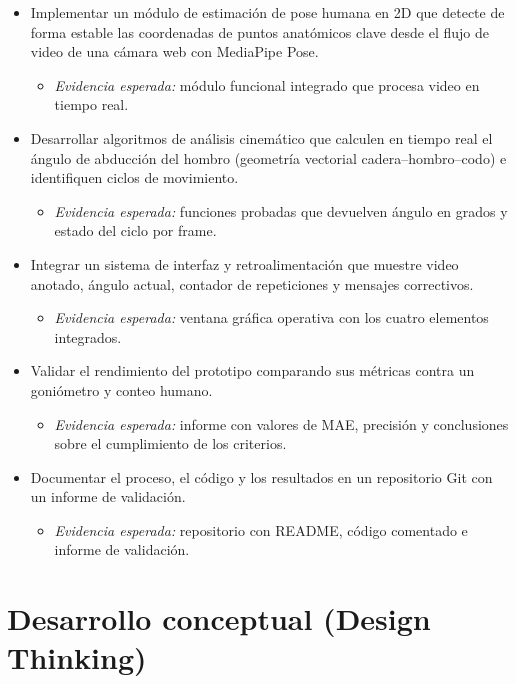 \documentclass[11pt,a4paper]{article}
\begin{document}
\begin{itemize}
  \item Implementar un módulo de estimación de pose humana en 2D que detecte de forma estable las coordenadas de puntos anatómicos clave desde el flujo de video de una cámara web con MediaPipe Pose.
  \begin{itemize}
    \item \textit{Evidencia esperada:} módulo funcional integrado que procesa video en tiempo real.
  \end{itemize}
  \item Desarrollar algoritmos de análisis cinemático que calculen en tiempo real el ángulo de abducción del hombro (geometría vectorial cadera--hombro--codo) e identifiquen ciclos de movimiento.
  \begin{itemize}
    \item \textit{Evidencia esperada:} funciones probadas que devuelven ángulo en grados y estado del ciclo por frame.
  \end{itemize}
  \item Integrar un sistema de interfaz y retroalimentación que muestre video anotado, ángulo actual, contador de repeticiones y mensajes correctivos.
  \begin{itemize}
    \item \textit{Evidencia esperada:} ventana gráfica operativa con los cuatro elementos integrados.
  \end{itemize}
  \item Validar el rendimiento del prototipo comparando sus métricas contra un goniómetro y conteo humano.
  \begin{itemize}
    \item \textit{Evidencia esperada:} informe con valores de MAE, precisión y conclusiones sobre el cumplimiento de los criterios.
  \end{itemize}
  \item Documentar el proceso, el código y los resultados en un repositorio Git con un informe de validación.
  \begin{itemize}
    \item \textit{Evidencia esperada:} repositorio con README, código comentado e informe de validación.
  \end{itemize}
\end{itemize}

\clearpage
{}
\section{Desarrollo conceptual (Design Thinking)}
\end{document}
